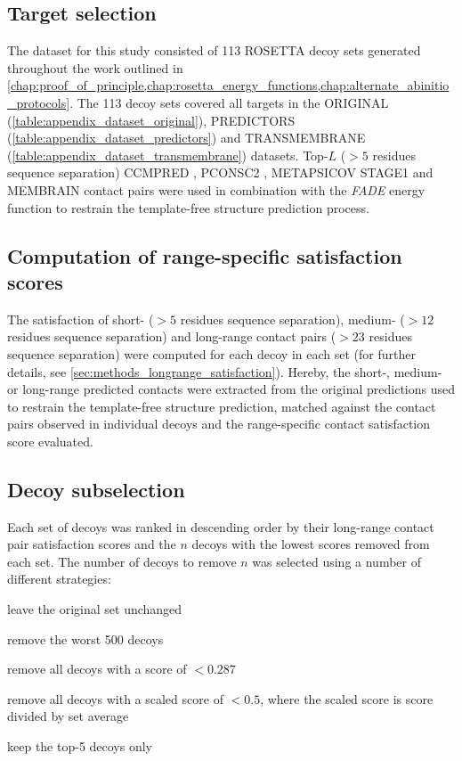 \subsection{Target selection}
The dataset for this study consisted of 113 ROSETTA decoy sets generated throughout the work outlined in \cref{chap:proof_of_principle,chap:rosetta_energy_functions,chap:alternate_abinitio_protocols}. The 113 decoy sets covered all targets in the ORIGINAL (\cref{table:appendix_dataset_original}), PREDICTORS (\cref{table:appendix_dataset_predictors}) and TRANSMEMBRANE (\cref{table:appendix_dataset_transmembrane}) datasets. Top-$L$ ($>5$ residues sequence separation) CCMPRED \cite{Seemayer2014-zp}, PCONSC2 \cite{Skwark2014-qp}, METAPSICOV STAGE1 \cite{Jones2015-vq} and MEMBRAIN \cite{Yang2013-bf} contact pairs were used in combination with the \textit{FADE} energy function to restrain the template-free structure prediction process.

\subsection{Computation of range-specific satisfaction scores}
The satisfaction of short- ($>5$ residues sequence separation), medium- ($>12$ residues sequence separation) and long-range contact pairs ($>23$ residues sequence separation) were computed for each decoy in each set (for further details, see \cref{sec:methods_longrange_satisfaction}). Hereby, the short-, medium- or long-range predicted contacts were extracted from the original predictions used to restrain the template-free structure prediction, matched against the contact pairs observed in individual decoys and the range-specific contact satisfaction score evaluated. 

\subsection{Decoy subselection} \label{sec:ample_decoys_decoy_selection}
Each set of decoys was ranked in descending order by their long-range contact pair satisfaction scores and the $n$ decoys with the lowest scores removed from each set. The number of decoys to remove $n$ was selected using a number of different strategies:

\begin{description}[style=multiline,leftmargin=4cm]
    \item[\textit{NONE}] leave the original set unchanged
    \item[\textit{LINEAR}] remove the worst 500 decoys
    \item[\textit{CUTOFF}] remove all decoys with a score of $<0.287$ 
    \item[\textit{SCALED}] remove all decoys with a scaled score of $<0.5$, where the scaled score is score divided by set average
    \item[\textit{INDIVIDUAL}] keep the top-5 decoys only
\end{description}

